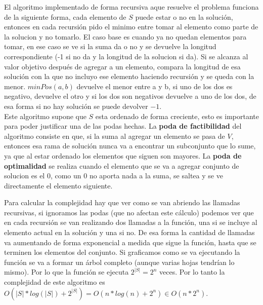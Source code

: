 \documentclass[a4paper]{article}
\begin{document}
El algoritmo implementado de forma recursiva aque resuelve el problema funciona de la siguiente forma, cada elemento de $S$ puede estar o no en la solución, entonces en cada recursión pido el minimo entre tomar al elemento como parte de la solucion y no tomarlo. El caso base es cuando ya no quedan elementos para tomar, en ese caso se ve si la suma da o no y se devuelve la longitud correspondiente (-1 si no da y la longitud de la solucion si da). Si se alcanza al valor objetivo después de agregar a un elemento, compara la longitud de esa solución con la que no incluyo ese elemento haciendo recursión y se queda con la menor. $minPos(a, b)$ devuelve el menor entre a y b, si uno de los dos es negativo, devuelve el otro y si los dos son negativos devuelve a uno de los dos, de esa forma si no hay solución se puede devolver $-1$.
\\
Este algoritmo supone que $S$ esta ordenado de forma creciente, esto es importante para poder justificar una de las podas hechas. La \textbf{poda de factibilidad} del algoritmo consiste en que, si la suma al agregar un elemento se pasa de $V$, entonces esa rama de solución nunca va a encontrar un subconjunto que lo sume, ya que al estar ordenado los elementos que siguen son mayores.
La \textbf{poda de optimalidad} se realiza cuando el elemento que se va a agregar conjunto de solucion es el 0, como un 0 no aporta nada a la suma, se saltea y se ve directamente el elemento siguiente.

Para calcular la complejidad hay que ver como se van abriendo las llamadas recursivas, si ignoramos las podas (que no afectan este cálculo) podemos ver que en cada recursión se van realizando dos llamadas a la función, una si se incluye al elemento actual en la solución y una si no. De esa forma la cantidad de llamadas va aumentando de forma exponencial a medida que sigue la función, hasta que se terminen los elementos del conjunto. Si graficamos como se va ejecutando la función se va a formar un árbol completo (aunque varias hojas tendrían lo mismo). Por lo que la función se ejecuta $2^{|S|} = 2^n$ veces.
Por lo tanto la complejidad de este algoritmo es $O(|S|*log(|S|) + 2^|S|) = O(n*log(n) + 2^n) \in O(n*2^n)$.
 
\end{document}
